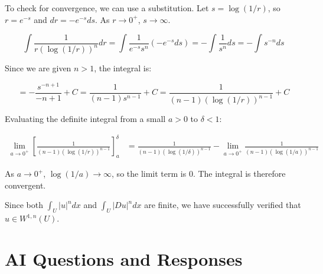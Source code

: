 \documentclass[12pt,a4paper]{report}
\begin{document}
\begin{enumerate}
\begin{description}
To check for convergence, we can use a substitution. Let $s = \log(1/r)$, so $r = e^{-s}$ and $dr = -e^{-s} ds$. As $r \to 0^+$, $s \to \infty$.

$$\int \frac{1}{r(\log(1/r))^n} dr = \int \frac{1}{e^{-s} s^n} (-e^{-s} ds) = -\int \frac{1}{s^n} ds = -\int s^{-n} ds$$

Since we are given $n>1$, the integral is:

$$= -\frac{s^{-n+1}}{-n+1} + C = \frac{1}{(n-1)s^{n-1}} + C = \frac{1}{(n-1)(\log(1/r))^{n-1}} + C$$

Evaluating the definite integral from a small $a>0$ to $\delta < 1$:

\begin{align*}
	\lim_{a \to 0^+} \left[ \frac{1}{(n-1)(\log(1/r))^{n-1}} \right]_a^\delta &= \frac{1}{(n-1)(\log(1/\delta))^{n-1}} - \lim_{a \to 0^+} \frac{1}{(n-1)(\log(1/a))^{n-1}}
\end{align*}

As $a \to 0^+$, $\log(1/a) \to \infty$, so the limit term is 0. The integral is therefore convergent.

Since both $\int_U |u|^n dx$ and $\int_U |Du|^n dx$ are finite, we have successfully verified that $u \in W^{1,n}(U)$.
\end{description}
\end{enumerate}

\HLINE
\section*{AI Questions and Responses}
\end{document}
